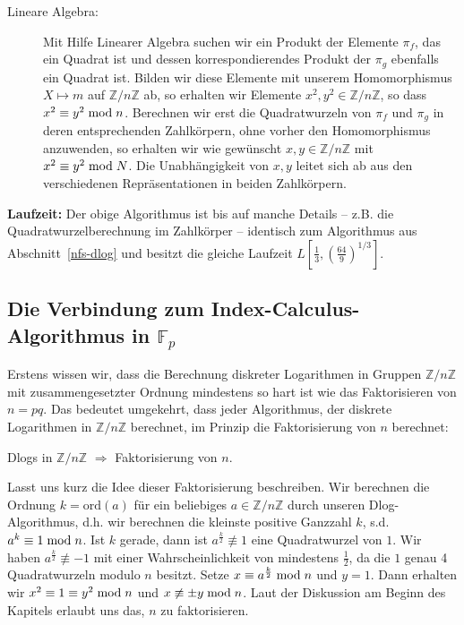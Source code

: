 \begin{refsegment}
\begin{description}
\item[Lineare Algebra:] Mit Hilfe Linearer Algebra suchen wir ein Produkt der Elemente $\pi_f$, das ein Quadrat ist und dessen korrespondierendes Produkt der $\pi_g$ ebenfalls ein Quadrat ist. Bilden wir diese Elemente mit unserem Homomorphismus $X \mapsto m$ auf $\mathbb{Z}/n\mathbb{Z}$ ab, so erhalten wir Elemente $x^2,y^2 \in \mathbb{Z}/n\mathbb{Z}$, so dass $x^2 \equiv y^2 \hspace{1mm}{\rm mod}\hspace{1mm} n$. Berechnen wir erst die Quadratwurzeln von $\pi_f$ und $\pi_g$ in deren entsprechenden Zahlkörpern, ohne vorher den Homomorphismus anzuwenden, so erhalten wir wie gewünscht $x, y \in \mathbb{Z}/n\mathbb{Z}$ mit $x^2 \equiv y^2 \hspace{1mm}{\rm mod}\hspace{1mm} N$. Die Unabhängigkeit von $x,y$ leitet sich ab aus den verschiedenen Repräsentationen in beiden Zahlkörpern.
\end{description}

\noindent \textbf{Laufzeit:}
Der obige Algorithmus ist bis auf manche Details -- z.B. die Quadratwurzelberechnung im Zahlkörper -- identisch zum Algorithmus aus Abschnitt~\ref{nfs-dlog} und besitzt die gleiche Laufzeit $L[\frac 1
3,\left(\frac{64}{9}\right)^{1/3}]$.


\subsection{\texorpdfstring{Die Verbindung zum Index-Calculus-Algorithmus in $\mathbb{F}_p$}{Die Verbindung zum Index-Calculus-Algorithmus in Fp}}

Erstens wissen wir, dass die Berechnung diskreter Logarithmen in Gruppen $\mathbb{Z}/n\mathbb{Z}$ mit zusammengesetzter Ordnung mindestens so hart ist wie das Faktorisieren von $n=pq$. Das bedeutet umgekehrt, dass jeder Algorithmus, der diskrete Logarithmen in $\mathbb{Z}/n\mathbb{Z}$ berechnet, im Prinzip die Faktorisierung von $n$ berechnet:
\begin{center}
  Dlogs in $\mathbb{Z}/n\mathbb{Z}$ $\Rightarrow$ Faktorisierung von $n$.
\end{center}

Lasst uns kurz die Idee dieser Faktorisierung beschreiben. Wir berechnen die Ordnung $k=\textrm{ord}(a)$ für ein beliebiges $a \in \mathbb{Z}/n\mathbb{Z}$ durch unseren Dlog-Algorithmus, d.h. wir berechnen die kleinste positive Ganzzahl $k$, s.d. $a^{k} \equiv 1 \hspace{1mm}{\rm mod}\hspace{1mm} n$. Ist $k$ gerade, dann ist $a^{\frac k 2} \not\equiv 1$ eine Quadratwurzel von $1$. Wir haben $a^{\frac k 2} \not\equiv -1$ mit einer Wahrscheinlichkeit von mindestens $\frac 1 2$, da die $1$ genau 4 Quadratwurzeln modulo $n$ besitzt. Setze $x \equiv a^{\frac k 2} \hspace{1mm}{\rm mod}\hspace{1mm} n$ und $y = 1$. Dann erhalten wir $x^2 \equiv 1 \equiv y^2 \hspace{1mm}{\rm mod}\hspace{1mm} n$ und $x \not \equiv \pm y \hspace{1mm}{\rm mod}\hspace{1mm} n$. Laut der Diskussion am Beginn des Kapitels erlaubt uns das, $n$ zu faktorisieren.\\[0.1cm]


\end{refsegment}
